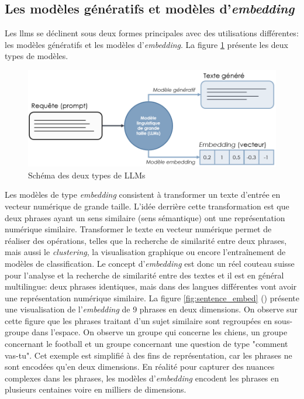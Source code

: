 \subsection{Les modèles génératifs et modèles d'\textit{embedding}}
Les \gls{llms} se déclinent sous deux formes principales avec des utilisations différentes: les modèles génératifs et les modèles d'\textit{embedding}. La figure \ref{fig:llm-type} présente les deux types de modèles.
\begin{figure}[!ht]
 \centering
 \includegraphics[width=1\textwidth]{figures/two_llm.png}
 \caption[Schéma des deux types de LLMs]{Schéma des deux types de LLMs}
 \label{fig:llm-type}
\end{figure}
Les modèles de type \textit{embedding} consistent à transformer un texte d'entrée en vecteur numérique de grande taille. L'idée derrière cette transformation est que deux phrases ayant un sens similaire (sens sémantique) ont une représentation numérique similaire. Transformer le texte en vecteur numérique permet de réaliser des opérations, telles que la recherche de similarité entre deux phrases, mais aussi le \textit{clustering},  la visualisation graphique ou encore l'entraînement de modèles de classification. Le concept d'\textit{embedding} est donc un réel couteau suisse pour l'analyse et la recherche de similarité entre des textes et il est en général multilingue: deux phrases identiques, mais dans des langues différentes vont avoir une représentation numérique similaire. La figure \ref{fig:sentence_embed}  (\cite{luis_serrano_what_2023}) présente une visualisation de l'\textit{embedding} de 9 phrases en deux dimensions. On observe sur cette figure que les phrases traitant d'un sujet similaire sont regroupées en sous-groupe dans l'espace. On observe un groupe qui concerne les chiens, un groupe concernant le football et un groupe concernant une question de type "comment vas-tu". Cet exemple est simplifié à des fins de représentation, car les phrases ne sont encodées qu'en deux dimensions. En réalité pour capturer des nuances complexes dans les phrases, les modèles d'\textit{embedding} encodent les phrases en plusieurs centaines voire en milliers de dimensions.
